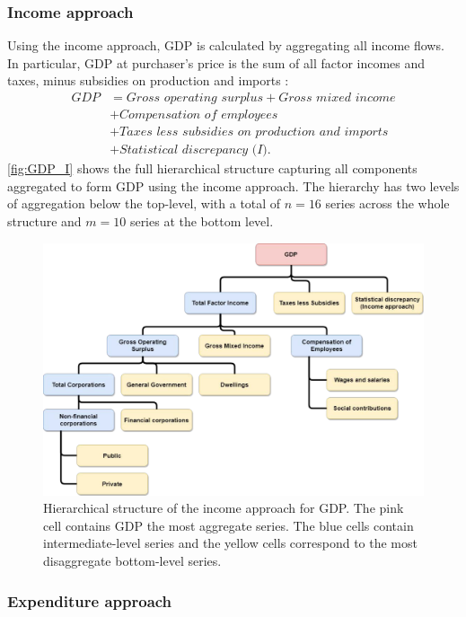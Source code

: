 \documentclass[graybox]{svmult}
\begin{document}
\subsubsection*{Income approach}

Using the income approach, GDP is calculated by aggregating all income flows. In particular, GDP at purchaser's price is the sum of all factor incomes and taxes, minus subsidies on production and imports \citep{ABS2015}:
\begin{align*}
	\textit{GDP}
	  & = \textit{Gross operating surplus} + \textit{Gross mixed income} \\
	  & + \textit{Compensation of employees} \\
	  & + \textit{Taxes less subsidies on production and imports} \\
	  & + \textit{Statistical discrepancy (I)}.
\end{align*}
\autoref{fig:GDP_I} shows the full hierarchical structure capturing all components aggregated to form GDP using the income approach. The hierarchy has two levels of aggregation below the top-level, with a total of $n=16$ series across the whole structure and $m=10$ series at the bottom level.

\begin{figure}[!h]
	\centering
	\includegraphics[width=.9\textwidth]{Figs/Hierarchical-structures/IncomeApproach.pdf}
	\caption{Hierarchical structure of the income approach for GDP\@. The pink cell contains GDP the most aggregate series. The blue cells contain intermediate-level series and the yellow cells correspond to the most disaggregate bottom-level series.}\label{fig:GDP_I}
\end{figure}

\subsubsection*{Expenditure approach}
\end{document}
